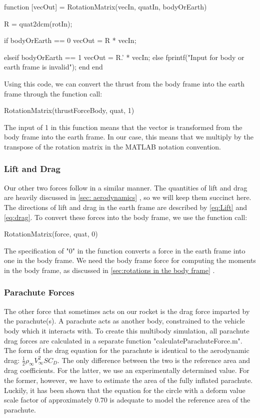 \documentclass[10pt, openany, titlepage]{book}
\theoremstyle{definition}
\let\oldautoref\autoref
\renewcommand{\autoref}[1]{%
  \begingroup
  \hypersetup{linkcolor=black}%
  \oldautoref{#1}%
  \endgroup
}
\begin{document}
\begin{matlabscript}{}
function [vecOut] = RotationMatrix(vecIn, quatIn, bodyOrEarth)
    
    R = quat2dcm(rotIn);
    
    if bodyOrEarth == 0
        vecOut = R * vecIn;
    
    elseif bodyOrEarth == 1
        vecOut = R.' * vecIn;
    else
        fprintf("Input for body or earth frame is invalid\n");
    end
end
\end{matlabscript}

Using this code, we can convert the thrust from the \gls{body frame} into the earth frame through the function call:
\begin{matlabscript}{}
RotationMatrix(thrustForceBody, quat, 1)
\end{matlabscript}

The input of 1 in this function means that the vector is transformed from the \gls{body frame} into the earth frame. In our case, this means that we multiply by the transpose of the rotation matrix in the MATLAB notation convention.
\subsubsection{Lift and Drag}
Our other two forces follow in a similar manner. The quantities of lift and drag are heavily discussed in \autoref{sec: aerodynamics}, so we will keep them succinct here. The directions of lift and drag in the earth frame are described by \eqref{eq:Lift} and \eqref{eq:drag}. To convert these forces into the \gls{body frame}, we use the function call:
\begin{matlabscript}{}
RotationMatrix(force, quat, 0)
\end{matlabscript}
The specification of "0" in the function converts a force in the earth frame into one in the \gls{body frame}. We need the \gls{body frame} force for computing the moments in the \gls{body frame}, as discussed in \autoref{sec:rotations in the body frame}.
\subsubsection{Parachute Forces}

The other force that sometimes acts on our rocket is the drag force imparted by the parachute(s). A parachute acts as another body, constrained to the vehicle body which it interacts with. To create this multibody simulation, all parachute drag forces are calculated in a separate function "calculateParachuteForce.m". The form of the drag equation for the parachute is identical to the aerodynamic drag: $\frac{1}{2}\rho_{\infty} V_{\infty}^2SC_D$. The only difference between the two is the reference area and drag coefficients. For the latter, we use an experimentally determined value. For the former, however, we have to estimate the area of the fully inflated parachute. Luckily, it has been shown that the equation for the circle with a deform value scale factor of approximately 0.70 is adequate to model the reference area of the parachute. 
\end{document}
